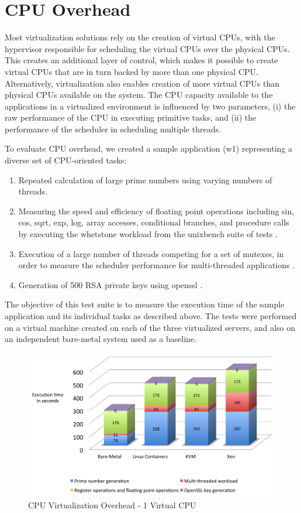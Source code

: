 \newpage
\section{CPU Overhead}

Most virtualization solutions rely on the creation of virtual CPUs, with the hypervisor responsible for scheduling the virtual CPUs over the physical CPUs. This creates an additional layer of control, which makes it possible to create  virtual CPUs that are in turn backed by more than one physical CPU. Alternatively, virtualization also enables creation of more virtual CPUs than physical CPUs available on the system. The CPU capacity available to the applications in a virtualized environment is influenced by two parameters, (i) the raw performance of the CPU in executing primitive tasks, and (ii) the performance of the scheduler in scheduling multiple threads.


To evaluate CPU overhead, we created a sample application (w1) representing a diverse set of CPU-oriented tasks:
\begin{enumerate}
 \item Repeated calculation of large prime numbers using varying numbers of threads.
 \item Measuring the speed and efficiency of floating point operations including sin, cos, sqrt, exp, log, array accesses, conditional branches, and procedure calls by executing the whetstone workload from the unixbench suite of tests \cite{unixbench}.
 \item Execution of a large number of threads competing for a set of mutexes, in order to measure the scheduler performance for multi-threaded applications \cite{sysbench}.
 \item Generation of 500 RSA private keys using openssl \cite{openssl}.
 \end{enumerate}  

The objective of this test suite is to measure the execution time of the sample application and its individual tasks as described above. The tests were performed on a virtual machine created on each of the three virtualized servers, and also on an independent bare-metal system used as a baseline.

\begin{figure}[H]
\centering
\includegraphics[width=140mm]{1cpu.png}
\caption{CPU Virtualization Overhead - 1 Virtual CPU}
\label{fig:1cpu}
\end{figure}

